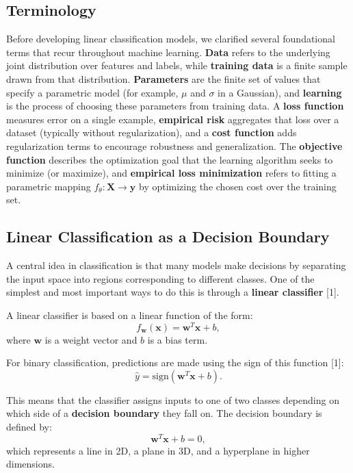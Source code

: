 \documentclass{article}
\renewcommand{\cite}[1]{[#1]}
\begin{document}
\subsection{Terminology}

Before developing linear classification models, we clarified several foundational terms that recur throughout machine learning. \textbf{Data} refers to the underlying joint distribution over features and labels, while \textbf{training data} is a finite sample drawn from that distribution. \textbf{Parameters} are the finite set of values that specify a parametric model (for example, $\mu$ and $\sigma$ in a Gaussian), and \textbf{learning} is the process of choosing these parameters from training data. A \textbf{loss function} measures error on a single example, \textbf{empirical risk} aggregates that loss over a dataset (typically without regularization), and a \textbf{cost function} adds regularization terms to encourage robustness and generalization. The \textbf{objective function} describes the optimization goal that the learning algorithm seeks to minimize (or maximize), and \textbf{empirical loss minimization} refers to fitting a parametric mapping $f_\theta:\textbf{X}\rightarrow\textbf{y}$ by optimizing the chosen cost over the training set.

\subsection{Linear Classification as a Decision Boundary}

A central idea in classification is that many models make decisions by separating the input space into regions corresponding to different classes. One of the simplest and most important ways to do this is through a \textbf{linear classifier} \cite{1}.

A linear classifier is based on a linear function of the form:
\[
f_{\mathbf{w}}(\mathbf{x}) = \mathbf{w}^T \mathbf{x} + b,
\]
where $\mathbf{w}$ is a weight vector and $b$ is a bias term.

For binary classification, predictions are made using the sign of this function \cite{1}:
\[
\hat{y} = \text{sign}(\mathbf{w}^T \mathbf{x} + b).
\]

This means that the classifier assigns inputs to one of two classes depending on which side of a \textbf{decision boundary} they fall on. The decision boundary is defined by:
\[
\mathbf{w}^T \mathbf{x} + b = 0,
\]
which represents a line in 2D, a plane in 3D, and a hyperplane in higher dimensions.
\end{document}
